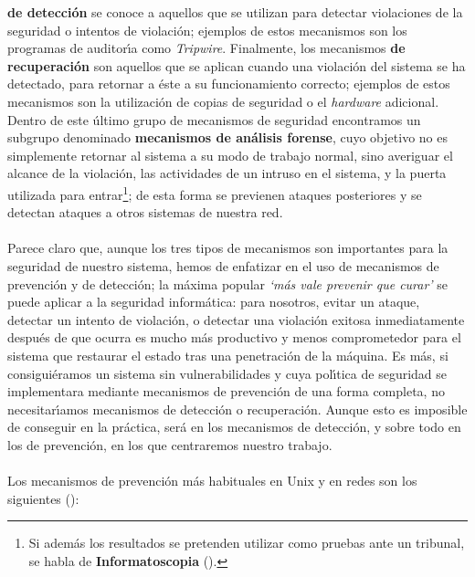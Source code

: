{\bf de detecci\'on} se conoce a aquellos que se utilizan para detectar 
violaciones de la seguridad o intentos de violaci\'on; ejemplos de estos 
mecanismos son los programas de auditor\'{\i}a como {\it Tripwire}. Finalmente,
los mecanismos {\bf de recuperaci\'on} son aquellos que se aplican cuando una
violaci\'on del sistema se ha detectado, para retornar a \'este a su 
funcionamiento correcto; ejemplos de estos mecanismos son la utilizaci\'on de
copias de seguridad o el {\it hardware} adicional. Dentro de este \'ultimo grupo
de mecanismos de seguridad encontramos un subgrupo denominado {\bf mecanismos
de an\'alisis forense}, cuyo objetivo no es simplemente retornar al sistema
a su modo de trabajo normal, sino averiguar el alcance de la violaci\'on, las
actividades de un intruso en el sistema, y la puerta utilizada para 
entrar\footnote{Si adem\'as los resultados se pretenden utilizar como 
pruebas ante un tribunal, se habla de {\bf Informatoscopia} 
(\cite{kn:gal96}).}; de esta forma se previenen ataques posteriores y se 
detectan ataques a otros sistemas de nuestra red.\\
\\Parece claro que, aunque los tres tipos de mecanismos son importantes para
la seguridad de nues\-tro sistema, hemos de enfatizar en el uso de mecanismos de
prevenci\'on y de detecci\'on; la m\'axima popular {\it `m\'as vale prevenir 
que curar'} se puede aplicar a la seguridad inform\'atica: para nosotros, 
evitar un ataque, detectar un intento de violaci\'on, o detectar una 
violaci\'on exitosa inmediatamente despu\'es de que ocurra es mucho m\'as 
productivo y menos comprometedor para el sistema que restaurar el estado tras 
una penetraci\'on de la m\'aquina. Es m\'as, si consigui\'eramos un sistema sin 
vulnerabilidades y cuya pol\'{\i}tica de seguridad se implementara mediante 
mecanismos de prevenci\'on de una forma completa, no necesitar\'{\i}amos 
mecanismos de detecci\'on o recuperaci\'on. Aunque esto es imposible de 
conseguir en la pr\'actica, ser\'a en los mecanismos de detecci\'on, y sobre 
todo en los de prevenci\'on, en los que centraremos nuestro trabajo.\\
\\Los mecanismos de prevenci\'on m\'as habituales en Unix y en redes son los
siguientes (\cite{kn:olo92}):
